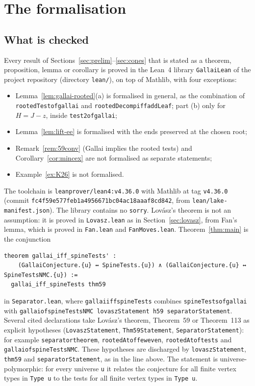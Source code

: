 \documentclass[11pt]{amsart}
\theoremstyle{definition}
\theoremstyle{remark}
\renewcommand{\_}{\oldunderscore\allowbreak}
\begin{document}
\section{The formalisation}\label{sec:lean}

\subsection{What is checked}
Every result of Sections~\ref{sec:prelim}--\ref{sec:cones} that is stated as a theorem,
proposition, lemma or corollary is proved in the Lean~4 library \texttt{GallaiLean} of the project
repository (directory \texttt{lean/}), on top of Mathlib, with four exceptions:
\begin{itemize}
\item Lemma~\ref{lem:gallai-rooted}(a) is formalised in general, as the combination of
\texttt{rootedTest\_of\_gallai} and \texttt{rootedDecomp\_iff\_addLeaf}; part (b) only for $H=J-z$,
inside \texttt{test2\_of\_gallai};
\item Lemma~\ref{lem:lift-ee} is formalised with the ends preserved at the chosen root;
\item Remark~\ref{rem:59conv} (Gallai implies the rooted tests) and Corollary~\ref{cor:mincex} are not
formalised as separate statements;
\item Example~\ref{ex:K26} is not formalised.
\end{itemize}
The toolchain is \texttt{leanprover/lean4:v4.36.0} with Mathlib at tag \texttt{v4.36.0} (commit
\texttt{fc4f59e577feb1a4956671bc04ac18aaaf8cd842}, from \texttt{lean/lake-manifest.json}). The
library contains no \texttt{sorry}. Lov\'asz's theorem is not an assumption: it is proved in
\texttt{Lovasz.lean} as in Section~\ref{sec:lovasz}, from Fan's lemma, which is proved in
\texttt{Fan.lean} and \texttt{FanMoves.lean}. Theorem~\ref{thm:main} is the conjunction
{\footnotesize
\begin{verbatim}
theorem gallai_iff_spineTests' :
    (GallaiConjecture.{u} ↔ SpineTests.{u}) ∧ (GallaiConjecture.{u} ↔ SpineTestsNMC.{u}) :=
  gallai_iff_spineTests thm59
\end{verbatim}
}
in \texttt{Separator.lean}, where \texttt{gallai\_iff\_spineTests} combines
\texttt{spineTests\_of\_gallai} with \texttt{gallai\_of\_spineTestsNMC lovaszStatement h59
separatorStatement}. Several cited declarations take Lov\'asz's theorem, Theorem~59 or
Theorem~113 as explicit hypotheses (\texttt{LovaszStatement}, \texttt{Thm59Statement},
\texttt{SeparatorStatement}): for example \texttt{separator\_theorem},
\texttt{rootedAt\_of\_few\_even}, \texttt{rootedAt\_of\_tests} and
\texttt{gallai\_of\_spineTestsNMC}. These hypotheses are discharged by \texttt{lovaszStatement},
\texttt{thm59} and \texttt{separatorStatement}, as in the line above. The statement is
universe-polymorphic: for every universe \texttt{u} it relates the conjecture for all finite vertex
types in \texttt{Type u} to the tests for all finite vertex types in \texttt{Type u}.
\end{document}
